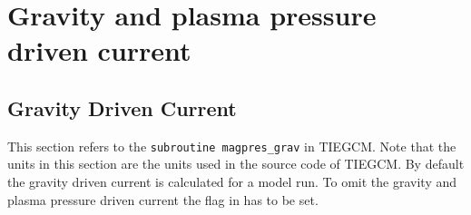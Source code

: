 \section{Gravity and plasma pressure driven current}
%
\subsection{Gravity Driven Current}\label{subsec:grav_current}
%
This section refers to the \texttt{subroutine magpres\_grav} in TIEGCM. Note that
the units in this section are the units used in the source code of
TIEGCM. By default the gravity driven current is calculated for a model run.
To omit the gravity and plasma pressure driven current the flag  in  
has to be set. \\

